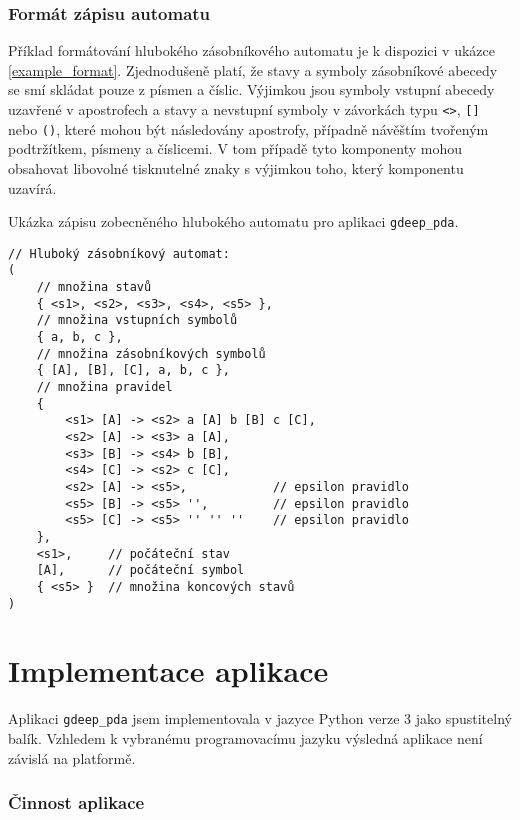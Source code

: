\subsubsection{Formát zápisu automatu}\label{kap_aplikace_format}

Příklad formátování hlubokého zásobníkového automatu je k dispozici v ukázce \ref{example_format}. Zjednodušeně platí, že
stavy a symboly zásobníkové abecedy se smí skládat pouze z písmen a číslic. Výjimkou jsou symboly vstupní abecedy uzavřené v apostrofech a stavy a nevstupní symboly v závorkách typu \texttt{<>}, \texttt{[]} nebo \texttt{()}, které mohou být následovány apostrofy, případně návěštím tvořeným podtržítkem, písmeny a číslicemi. V tom případě tyto komponenty mohou obsahovat libovolné tisknutelné znaky s výjimkou toho, který komponentu uzavírá.


\begin{Example} \label{example_format}
Ukázka zápisu zobecněného hlubokého automatu pro aplikaci \texttt{gdeep\_pda}.

\begin{verbatim}
// Hluboký zásobníkový automat:
(
    // množina stavů
    { <s1>, <s2>, <s3>, <s4>, <s5> },
    // množina vstupních symbolů
    { a, b, c },
    // množina zásobníkových symbolů
    { [A], [B], [C], a, b, c },
    // množina pravidel
    { 
        <s1> [A] -> <s2> a [A] b [B] c [C],
        <s2> [A] -> <s3> a [A],
        <s3> [B] -> <s4> b [B],
        <s4> [C] -> <s2> c [C],
        <s2> [A] -> <s5>,            // epsilon pravidlo
        <s5> [B] -> <s5> '',         // epsilon pravidlo
        <s5> [C] -> <s5> '' '' ''    // epsilon pravidlo
    },
    <s1>,     // počáteční stav
    [A],      // počáteční symbol
    { <s5> }  // množina koncových stavů	
)
\end{verbatim}
\end{Example}

\section{Implementace aplikace}

Aplikaci \texttt{gdeep\_pda} jsem implementovala v jazyce Python verze 3 jako spustitelný balík. Vzhledem k vybranému programovacímu jazyku výsledná aplikace není závislá na platformě.


\subsubsection{Činnost aplikace}

